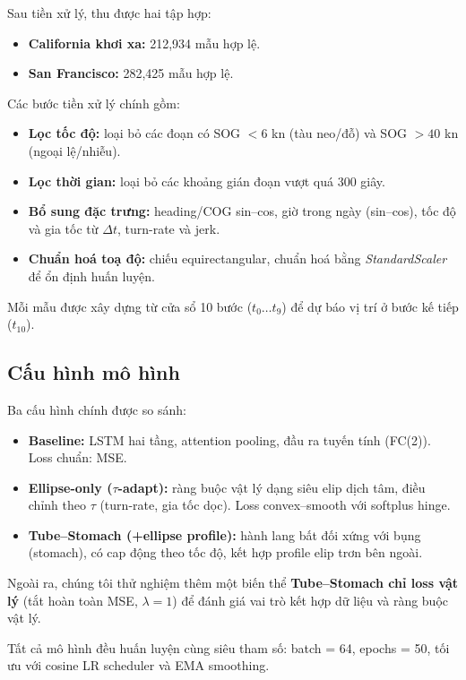 \documentclass{IEEEtran}
\begin{document}
Sau tiền xử lý, thu được hai tập hợp:
\begin{itemize}
  \item \textbf{California khơi xa:} 212{,}934 mẫu hợp lệ.
  \item \textbf{San Francisco:} 282{,}425 mẫu hợp lệ.
\end{itemize}

Các bước tiền xử lý chính gồm:
\begin{itemize}
  \item \textbf{Lọc tốc độ:} loại bỏ các đoạn có SOG $< 6$ kn (tàu neo/đỗ) và SOG $> 40$ kn (ngoại lệ/nhiễu).
  \item \textbf{Lọc thời gian:} loại bỏ các khoảng gián đoạn vượt quá 300 giây.
  \item \textbf{Bổ sung đặc trưng:} heading/COG sin--cos, giờ trong ngày (sin--cos), tốc độ và gia tốc từ $\Delta t$, turn-rate và jerk.
  \item \textbf{Chuẩn hoá toạ độ:} chiếu equirectangular, chuẩn hoá bằng \textit{StandardScaler} để ổn định huấn luyện.
\end{itemize}
Mỗi mẫu được xây dựng từ cửa sổ 10 bước ($t_0 \ldots t_9$) để dự báo vị trí ở bước kế tiếp ($t_{10}$).

\subsection{Cấu hình mô hình}
Ba cấu hình chính được so sánh:
\begin{itemize}
  \item \textbf{Baseline:} LSTM hai tầng, attention pooling, đầu ra tuyến tính (FC(2)). Loss chuẩn: MSE.
  \item \textbf{Ellipse-only ($\tau$-adapt):} ràng buộc vật lý dạng siêu elip dịch tâm, điều chỉnh theo $\tau$ (turn-rate, gia tốc dọc). Loss convex--smooth với softplus hinge.
  \item \textbf{Tube--Stomach (+ellipse profile):} hành lang bất đối xứng với bụng (stomach), có cap động theo tốc độ, kết hợp profile elip trơn bên ngoài. 
\end{itemize}
Ngoài ra, chúng tôi thử nghiệm thêm một biến thể \textbf{Tube--Stomach chỉ loss vật lý} (tắt hoàn toàn MSE, $\lambda=1$) để đánh giá vai trò kết hợp dữ liệu và ràng buộc vật lý.  

Tất cả mô hình đều huấn luyện cùng siêu tham số: batch = 64, epochs = 50, tối ưu với cosine LR scheduler và EMA smoothing.
\end{document}
